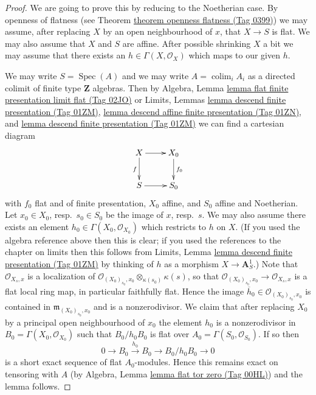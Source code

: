 \documentclass{amsart}
\theoremstyle{plain}
\theoremstyle{definition}
\theoremstyle{remark}
\numberwithin{equation}{subsection}
\def\colim{\mathop{\mathrm{colim}}\nolimits}
\def\Spec{\mathop{\mathrm{Spec}}}
\begin{document}
\begin{proof}
We are going to prove this by reducing to the Noetherian case.
By openness of flatness (see
Theorem \href{https://stacks.math.columbia.edu/tag/0399}{theorem openness flatness (Tag 0399)})
we may assume, after replacing $X$ by an
open neighbourhood of $x$, that $X \to S$ is flat.
We may also assume that $X$ and $S$ are affine.
After possible shrinking $X$ a bit we may assume that there exists
an $h \in \Gamma(X, \mathcal{O}_X)$ which maps to our given $h$.

\medskip\noindent
We may write $S = \Spec(A)$ and we may write $A = \colim_i A_i$
as a directed colimit of finite type $\mathbf{Z}$ algebras.
Then by
Algebra, Lemma \href{https://stacks.math.columbia.edu/tag/02JO}{lemma flat finite presentation limit flat (Tag 02JO)}
or
Limits, Lemmas \href{https://stacks.math.columbia.edu/tag/01ZM}{lemma descend finite presentation (Tag 01ZM)},
\href{https://stacks.math.columbia.edu/tag/01ZN}{lemma descend affine finite presentation (Tag 01ZN)}, and
\href{https://stacks.math.columbia.edu/tag/01ZM}{lemma descend finite presentation (Tag 01ZM)}
we can find a cartesian diagram
$$
\xymatrix{
X \ar[r] \ar[d]_f & X_0 \ar[d]^{f_0} \\
S \ar[r] & S_0
}
$$
with $f_0$ flat and of finite presentation, $X_0$ affine, and
$S_0$ affine and Noetherian. Let $x_0 \in X_0$, resp.\ $s_0 \in S_0$
be the image of $x$, resp.\ $s$. We may also assume there exists an element
$h_0 \in \Gamma(X_0, \mathcal{O}_{X_0})$ which restricts to $h$ on $X$.
(If you used the algebra reference above then this is clear; if you used
the references to the chapter on limits then this follows from
Limits, Lemma \href{https://stacks.math.columbia.edu/tag/01ZM}{lemma descend finite presentation (Tag 01ZM)}
by thinking of $h$ as a morphism $X \to \mathbf{A}^1_S$.)
Note that $\mathcal{O}_{X_s, x}$ is a localization of
$\mathcal{O}_{(X_0)_{s_0}, x_0} \otimes_{\kappa(s_0)} \kappa(s)$, so that
$\mathcal{O}_{(X_0)_{s_0}, x_0} \to \mathcal{O}_{X_s, x}$ is a flat
local ring map, in particular faithfully flat. Hence the image
$\overline{h}_0 \in \mathcal{O}_{(X_0)_{s_0}, x_0}$
is contained in $\mathfrak m_{(X_0)_{s_0}, x_0}$ and is a nonzerodivisor.
We claim that after replacing $X_0$ by a principal open neighbourhood of
$x_0$ the element $h_0$ is a nonzerodivisor in
$B_0 = \Gamma(X_0, \mathcal{O}_{X_0})$ such that $B_0/h_0B_0$ is flat
over $A_0 = \Gamma(S_0, \mathcal{O}_{S_0})$.
If so then
$$
0 \to B_0 \xrightarrow{h_0} B_0 \to B_0/h_0B_0 \to 0
$$
is a short exact sequence of flat $A_0$-modules. Hence this remains exact
on tensoring with $A$ (by
Algebra, Lemma \href{https://stacks.math.columbia.edu/tag/00HL}{lemma flat tor zero (Tag 00HL)})
and the lemma follows.


\end{proof}
\end{document}
